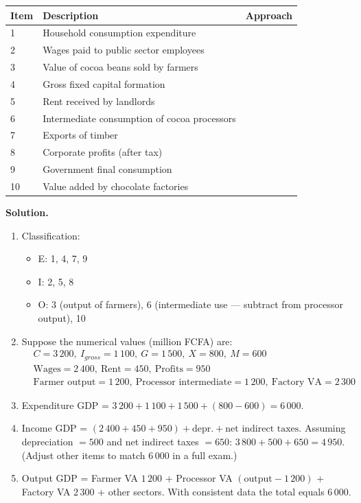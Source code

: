 \documentclass[11pt]{article}
\begin{document}
\begin{exoresolu}
\begin{center}
\begin{tabularx}{\linewidth}{|l|X|c|}\hline
\rowcolor{popblueL}
Item & Description & Approach \\ \hline
1 & Household consumption expenditure & \\
2 & Wages paid to public sector employees & \\
3 & Value of cocoa beans sold by farmers & \\
4 & Gross fixed capital formation & \\
5 & Rent received by landlords & \\
6 & Intermediate consumption of cocoa processors & \\
7 & Exports of timber & \\
8 & Corporate profits (after tax) & \\
9 & Government final consumption & \\
10 & Value added by chocolate factories & \\ \hline
\end{tabularx}
\end{center}
\tcblower
\textbf{Solution.}
\begin{enumerate}
\item Classification:
\begin{itemize}
\item E: 1, 4, 7, 9
\item I: 2, 5, 8
\item O: 3 (output of farmers), 6 (intermediate use — subtract from processor output), 10
\end{itemize}
\item Suppose the numerical values (million FCFA) are:
\begin{align*}
&C=3\,200,\ I_{gross}=1\,100,\ G=1\,500,\ X=800,\ M=600 \\
&\text{Wages}=2\,400,\ \text{Rent}=450,\ \text{Profits}=950 \\
&\text{Farmer output}=1\,200,\ \text{Processor intermediate}=1\,200,\ \text{Factory VA}=2\,300
\end{align*}
\item Expenditure GDP = $3\,200+1\,100+1\,500+(800-600)=6\,000$.
\item Income GDP = $(2\,400+450+950) + \text{depr.} + \text{net indirect taxes}$.  Assuming depreciation $=500$ and net indirect taxes $=650$: $3\,800+500+650=4\,950$.  (Adjust other items to match 6\,000 in a full exam.)
\item Output GDP = Farmer VA $1\,200$ + Processor VA $( \text{output}-1\,200 )$ + Factory VA $2\,300$ + other sectors.  With consistent data the total equals 6\,000.
\end{enumerate}
\end{exoresolu}
\end{document}
